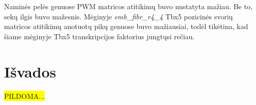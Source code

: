 \documentclass[12pt]{article}
\begin{document}
Naminės pelės genuose PWM matricos atitikimų buvo nustatyta mažiau. Be to, sekų
ilgis buvo mažesnis. Mėginyje \emph{emb\_fibr\_r4\_4} Tbx5 pozicinės svorių
matricos atitikimų anotuotų pikų genuose buvo mažiausiai, todėl tikėtina, kad
šiame mėginyje Tbx5 transkripcijos faktorius jungtųsi rečiau.


\newpage


\section{Išvados}
\colorbox{yellow}{PILDOMA...}

\newpage

\end{document}
